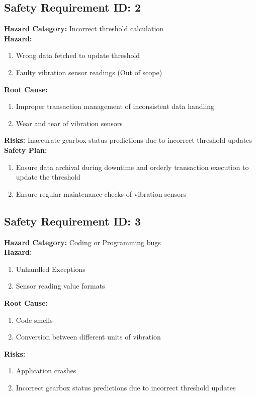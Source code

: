 \subsection{Safety Requirement ID: 2}		
\textbf{Hazard Category:} Incorrect threshold calculation\\
\textbf{Hazard:}
\begin{enumerate}
	\item Wrong data fetched to update threshold
	\item Faulty vibration sensor readings (Out of scope)
\end{enumerate}
\textbf{Root Cause:}
\begin{enumerate}
	\item Improper transaction management of inconsistent data handling
	\item Wear and tear of vibration sensors
\end{enumerate}
\textbf{Risks:} Inaccurate gearbox status predictions due to incorrect threshold updates\\
\textbf{Safety Plan:}
\begin{enumerate}
	\item Ensure data archival during downtime and orderly transaction execution to update the threshold
	\item Ensure regular maintenance checks of vibration sensors
\end{enumerate}

\subsection{Safety Requirement ID: 3}		
\textbf{Hazard Category:} Coding or Programming bugs\\
\textbf{Hazard:}
\begin{enumerate}
	\item Unhandled Exceptions
	\item Sensor reading value formats
\end{enumerate}
\textbf{Root Cause:}
\begin{enumerate}
	\item Code smells
	\item Conversion between different units of vibration
\end{enumerate}
\textbf{Risks:} 
 \begin{enumerate}
 	\item Application crashes
 	\item Incorrect gearbox status predictions due to incorrect threshold updates
 \end{enumerate}
 
